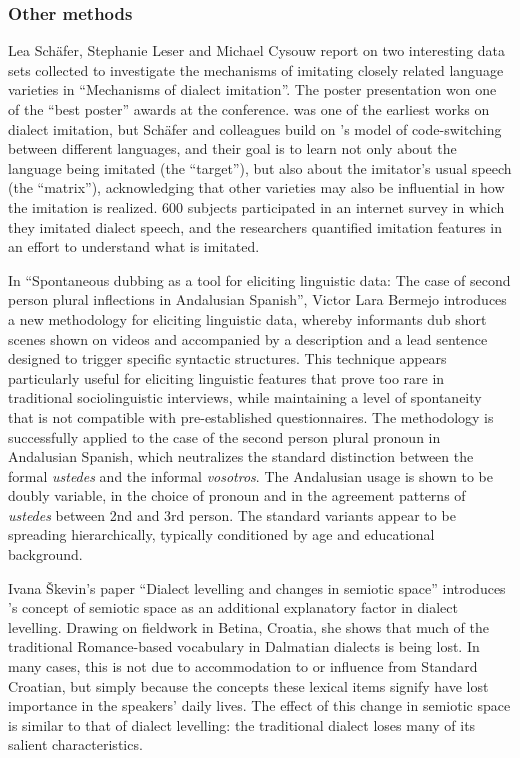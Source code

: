 \documentclass[output=paper]{LSP/langsci}
\begin{document}
\subsubsection{Other methods}
Lea Schäfer, Stephanie Leser and Michael Cysouw report on two interesting data sets collected to investigate the mechanisms of imitating closely related language varieties in “Mechanisms of dialect imitation”. The poster presentation won one of the “best poster” awards at the conference. \citet{purschke_regionalsprache_2011} was one of the earliest works on dialect imitation, but Schäfer and colleagues build on \citeauthor{myers-scotton_duelling_1993}'s \citeyearpar{myers-scotton_duelling_1993} model of code-switching between different languages, and their goal is to learn not only about the language being imitated (the “target”), but also about the imitator’s usual speech (the “matrix”), acknowledging that other varieties may also be influential in how the imitation is realized. 600 subjects participated in an internet survey in which they imitated dialect speech, and the researchers quantified imitation features in an effort to understand what is imitated.

In “Spontaneous dubbing as a tool for eliciting linguistic data: The case of second person plural inflections in Andalusian Spanish”, Victor Lara Bermejo introduces a new methodology for eliciting linguistic data, whereby informants dub short scenes shown on videos and accompanied by a description and a lead sentence designed to trigger specific syntactic structures. This technique appears particularly useful for eliciting linguistic features that prove too rare in traditional sociolinguistic interviews, while maintaining a level of spontaneity that is not compatible with pre-established questionnaires. The methodology is successfully applied to the case of the second person plural pronoun in Andalusian Spanish, which neutralizes the standard distinction between the formal \textit{ustedes} and the informal \textit{vosotros}. The Andalusian usage is shown to be doubly variable, in the choice of pronoun and in the agreement patterns of \textit{ustedes} between 2nd and 3rd person. The standard variants appear to be spreading hierarchically, typically conditioned by age and educational background. 

Ivana Škevin’s paper “Dialect levelling and changes in semiotic space” introduces \citeauthor{lotman_semiosphere_1985}’s \citeyearpar{lotman_semiosphere_1985} concept of semiotic space as an additional explanatory factor in dialect levelling. Drawing on fieldwork in Betina, Croatia, she shows that much of the traditional Romance-based vocabulary in Dalmatian dialects is being lost. In many cases, this is not due to accommodation to or influence from Standard Croatian, but simply because the concepts these lexical items signify have lost importance in the speakers’ daily lives. The effect of this change in semiotic space is similar to that of dialect levelling: the traditional dialect loses many of its salient characteristics.
\end{document}
